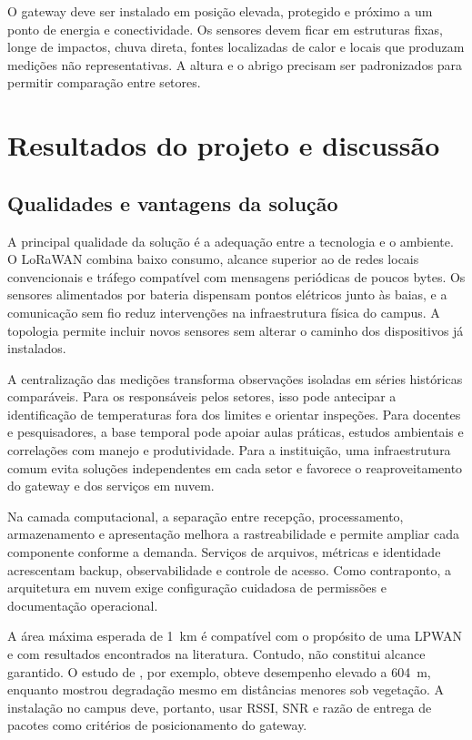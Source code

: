 \documentclass[10pt,a4paper,twocolumn]{article}
\begin{document}
O gateway deve ser instalado em posição elevada, protegido e próximo a um ponto
de energia e conectividade. Os sensores devem ficar em estruturas fixas, longe de
impactos, chuva direta, fontes localizadas de calor e locais que produzam
medições não representativas. A altura e o abrigo precisam ser padronizados para
permitir comparação entre setores.

\section{Resultados do projeto e discussão}

\subsection{Qualidades e vantagens da solução}

A principal qualidade da solução é a adequação entre a tecnologia e o ambiente.
O LoRaWAN combina baixo consumo, alcance superior ao de redes locais
convencionais e tráfego compatível com mensagens periódicas de poucos bytes. Os
sensores alimentados por bateria dispensam pontos elétricos junto às baias, e a
comunicação sem fio reduz intervenções na infraestrutura física do campus. A
topologia permite incluir novos sensores sem alterar o caminho dos dispositivos
já instalados.

A centralização das medições transforma observações isoladas em séries
históricas comparáveis. Para os responsáveis pelos setores, isso pode antecipar
a identificação de temperaturas fora dos limites e orientar inspeções. Para
docentes e pesquisadores, a base temporal pode apoiar aulas práticas, estudos
ambientais e correlações com manejo e produtividade. Para a instituição, uma
infraestrutura comum evita soluções independentes em cada setor e favorece o
reaproveitamento do gateway e dos serviços em nuvem.

Na camada computacional, a separação entre recepção, processamento,
armazenamento e apresentação melhora a rastreabilidade e permite ampliar cada
componente conforme a demanda. Serviços de arquivos, métricas e identidade
acrescentam backup, observabilidade e controle de acesso. Como contraponto, a
arquitetura em nuvem exige configuração cuidadosa de permissões e documentação
operacional.

A área máxima esperada de \SI{1}{\kilo\meter} é compatível com o propósito de uma
LPWAN e com resultados encontrados na literatura. Contudo, não constitui alcance
garantido. O estudo de , por exemplo, obteve desempenho
elevado a \SI{604}{\meter}, enquanto  mostrou degradação
mesmo em distâncias menores sob vegetação. A instalação no campus deve, portanto,
usar RSSI, SNR e razão de entrega de pacotes como critérios de posicionamento do
gateway.
\end{document}
